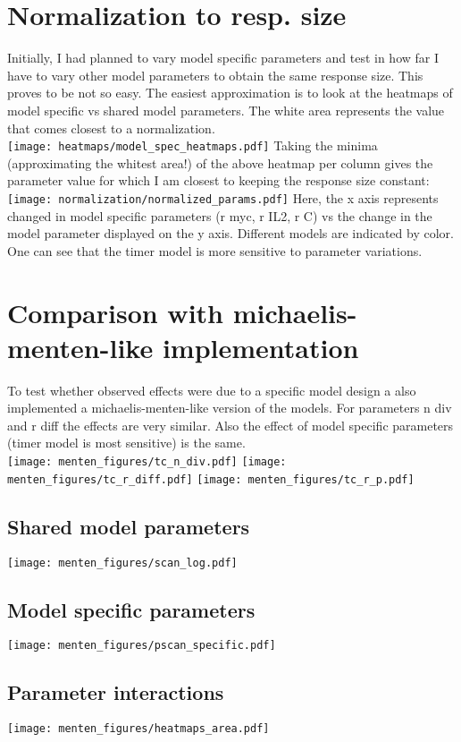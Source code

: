 \documentclass[12pt,a4paper]{article}
\begin{document}
\section*{Normalization to resp. size}
Initially, I had planned to vary model specific parameters and test in how far I have to vary other model parameters to obtain the same response size. This proves to be not so easy. The easiest approximation is to look at the heatmaps of model specific vs shared model parameters. The white area represents the value that comes closest to a normalization.\\
\texttt{[image: heatmaps/model\_spec\_heatmaps.pdf]}
Taking the minima (approximating the whitest area!) of the above heatmap per column gives the parameter value for which I am closest to keeping the response size constant:\\
\texttt{[image: normalization/normalized\_params.pdf]}
Here, the x axis represents changed in model specific parameters (r myc, r IL2, r C) vs the change in the model parameter displayed on the y axis. Different models are indicated by color. One can see that the timer model is more sensitive to parameter variations.
\newpage
\section*{Comparison with michaelis-menten-like implementation}
To test whether observed effects were due to a specific model design a also implemented a michaelis-menten-like version of the models. For parameters n div and r diff the effects are very similar. Also the effect of model specific parameters (timer model is most sensitive) is the same.\\
\texttt{[image: menten\_figures/tc\_n\_div.pdf]}
\texttt{[image: menten\_figures/tc\_r\_diff.pdf]}
\texttt{[image: menten\_figures/tc\_r\_p.pdf]}
\newpage
\subsection*{Shared model parameters}
\texttt{[image: menten\_figures/scan\_log.pdf]}
\subsection*{Model specific parameters}
\texttt{[image: menten\_figures/pscan\_specific.pdf]}
\subsection*{Parameter interactions}
\texttt{[image: menten\_figures/heatmaps\_area.pdf]}
\end{document}
